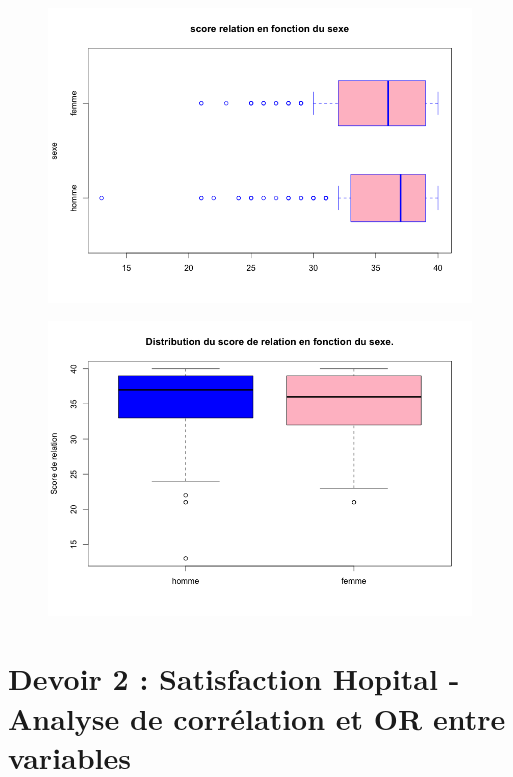 \begin{figure}[H]\begin{center}\includegraphics[scale=0.5]{ilu/Dev12.png}\end{center}\end{figure}
\begin{figure}[H]\begin{center}\includegraphics[scale=0.5]{ilu/Dev13.png}\end{center}\end{figure}

\newpage

\section{Devoir 2 : Satisfaction Hopital - Analyse de corrélation et OR entre variables}

